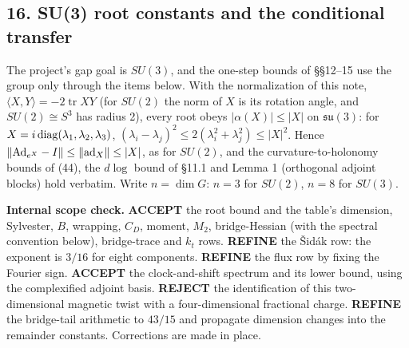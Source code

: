 \documentclass[11pt,a4paper]{article}
\begin{document}
\hypertarget{su3-root-constants-and-the-conditional-transfer}{%
\subsection{16. SU(3) root constants and the conditional
transfer}\label{su3-root-constants-and-the-conditional-transfer}}

The project's gap goal is \(SU(3)\), and the one-step bounds of §§12--15
use the group only through the items below. With the normalization of
this note, \(\langle X,Y\rangle=-2\operatorname{tr}XY\) (for \(SU(2)\)
the norm of \(X\) is its rotation angle, and \(SU(2)\cong S^3\) has
radius 2), every root obeys \(|\alpha(X)|\le|X|\) on
\(\mathfrak{su}(3)\): for
\(X=i\,{\rm diag}(\lambda_1,\lambda_2,\lambda_3)\),
\((\lambda_i-\lambda_j)^2\le2(\lambda_i^2+\lambda_j^2)\le|X|^2\). Hence
\(\|{\rm Ad}_{e^X}-I\|\le\|{\rm ad}_X\|\le|X|\), as for \(SU(2)\), and
the curvature-to-holonomy bounds of (44), the \(d\log\) bound of §11.1
and Lemma 1 (orthogonal adjoint blocks) hold verbatim. Write
\(n=\dim G\): \(n=3\) for \(SU(2)\), \(n=8\) for \(SU(3)\).

\textbf{Internal scope check.} \textbf{ACCEPT} the root bound and the
table's dimension, Sylvester, \(B\), wrapping, \(C_D\), moment, \(M_2\),
bridge-Hessian (with the spectral convention below), bridge-trace and
\(k_t\) rows. \textbf{REFINE} the Šidák row: the exponent is \(3/16\)
for eight components. \textbf{REFINE} the flux row by fixing the Fourier
sign. \textbf{ACCEPT} the clock-and-shift spectrum and its lower bound,
using the complexified adjoint basis. \textbf{REJECT} the identification
of this two-dimensional magnetic twist with a four-dimensional
fractional charge. \textbf{REFINE} the bridge-tail arithmetic to
\(43/15\) and propagate dimension changes into the remainder constants.
Corrections are made in place.
\end{document}
